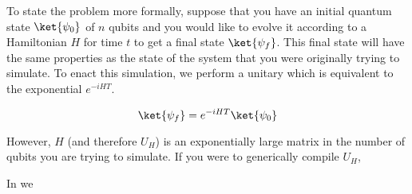 To state the problem more formally, suppose that you have an initial
quantum state $\ket{\psi_0}$ of $n$ qubits
and you would like to evolve it according to a Hamiltonian $H$ for time
$t$ to get
a final state $\ket{\psi_f}$. This final state will have the same properties
as the state of the system that you were originally trying to simulate. To
enact this simulation, we perform a unitary which is equivalent to the
exponential $e^{-iHT}$.

\begin{displaymath}
\ket{\psi_f} = e^{-iHT} \ket{\psi_0}
\end{displaymath}

However, $H$ (and therefore $U_H$)
is an exponentially large matrix in the number of qubits you
are trying to simulate. If you were to generically compile $U_H$, 

In \cite{Berry2005} we 